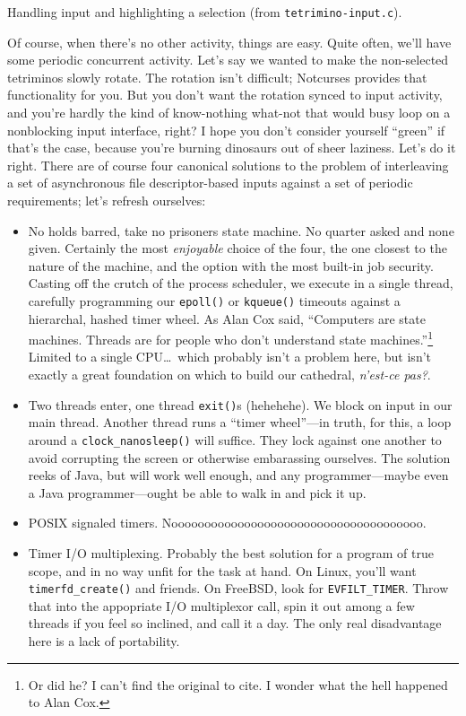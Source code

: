 \documentclass[letterpaper,10pt]{article}
\newenvironment{denseitemize}{
  \begin{itemize}
      \setlength{\itemsep}{0pt}
}{
  \end{itemize}
}
\begin{document}
\begin{listing}[!htbp]
\inputminted[]{C}{code/tetrimino-inputmain.h}
\caption{Handling input and highlighting a selection (from \texttt{tetrimino-input.c}).}
\label{list:tetrimino-input}
\end{listing}

Of course, when there's no other activity, things are easy. Quite often, we'll
have some periodic concurrent activity. Let's say we wanted to make the non-selected
tetriminos slowly rotate. The rotation isn't difficult; Notcurses provides
that functionality for you. But you don't want the rotation synced to input
activity, and you're hardly the kind of know-nothing what-not that would
busy loop on a nonblocking input interface, right? I hope you don't consider
yourself ``green'' if that's the case, because you're burning dinosaurs out
of sheer laziness. Let's do it right. There are of course four canonical
solutions to the problem of interleaving a set of asynchronous file descriptor-based
inputs against a set of periodic requirements; let's refresh ourselves:

\begin{denseitemize}
\item{No holds barred, take no prisoners state machine. No quarter asked and
    none given. Certainly the most \textit{enjoyable} choice of the four, the
    one closest to the nature of the machine, and the option with the most
    built-in job security. Casting off the crutch of the process scheduler, we
    execute in a single thread, carefully programming our
    \texttt{epoll()}\cite{epoll7} or \texttt{kqueue()}\cite{kqueue2} timeouts
    against a hierarchal, hashed timer wheel\cite{timerwheels}. As Alan Cox
    said, ``Computers are state machines. Threads are for people who don't
    understand state machines.''\footnote{Or did he? I can't find the original
    to cite. I wonder what the hell happened to Alan Cox.} Limited to a single
  CPU\ldots\ which probably isn't a problem here, but isn't exactly a great foundation
  on which to build our cathedral, \textfrench{\textit{n'est-ce pas?}}.}
\item{Two threads enter, one thread \texttt{exit()}s (hehehehe). We block on
    input in our main thread. Another thread runs a ``timer wheel''---in truth,
    for this, a loop around a \texttt{clock\_nanosleep()} will suffice. They
    lock against one another to avoid corrupting the screen or otherwise
    embarassing ourselves. The solution reeks of Java, but will work well
    enough, and any programmer---maybe even a Java programmer---ought be able
    to walk in and pick it up.}
\item{POSIX signaled timers. Noooooooooooooooooooooooooooooooooooooo.}
\item{Timer I/O multiplexing. Probably the best solution for a program of true
    scope, and in no way unfit for the task at hand. On Linux, you'll want
    \texttt{timerfd\_create()} and friends. On FreeBSD, look for \texttt{EVFILT\_TIMER}.
    Throw that into the appopriate I/O multiplexor call, spin it out among a
    few threads if you feel so inclined\cite{libtorque}, and call it a day.
  The only real disadvantage here is a lack of portability.}
\end{denseitemize}
\end{document}
